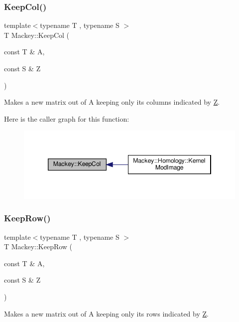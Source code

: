 \subsubsection{\texorpdfstring{Keep\+Col()}{KeepCol()}}
{\footnotesize\ttfamily template$<$typename T , typename S $>$ \\
T Mackey\+::\+Keep\+Col (\begin{DoxyParamCaption}\item[{const T \&}]{A,  }\item[{const S \&}]{Z }\end{DoxyParamCaption})}



Makes a new matrix out of A keeping only its columns indicated by \hyperlink{classZ}{Z}. 

Here is the caller graph for this function\+:\nopagebreak
\begin{figure}[H]
\begin{center}
\leavevmode
\includegraphics[width=346pt]{namespaceMackey_a9a8496759bc7bb14dcaa2284ae1d0491_icgraph}
\end{center}
\end{figure}
\mbox{\label{namespaceMackey_ad6870101d4fd762100a3115abc4a15db}} 
\subsubsection{\texorpdfstring{Keep\+Row()}{KeepRow()}}
{\footnotesize\ttfamily template$<$typename T , typename S $>$ \\
T Mackey\+::\+Keep\+Row (\begin{DoxyParamCaption}\item[{const T \&}]{A,  }\item[{const S \&}]{Z }\end{DoxyParamCaption})}



Makes a new matrix out of A keeping only its rows indicated by \hyperlink{classZ}{Z}. 

